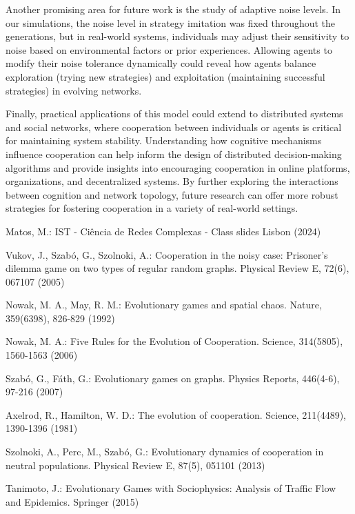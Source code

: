 \documentclass[runningheads]{llncs}
\begin{document}
Another promising area for future work is the study of adaptive noise levels. In our simulations, the noise level in strategy imitation was fixed throughout the generations, but in real-world systems, individuals may adjust their sensitivity to noise based on environmental factors or prior experiences. Allowing agents to modify their noise tolerance dynamically could reveal how agents balance exploration (trying new strategies) and exploitation (maintaining successful strategies) in evolving networks.

Finally, practical applications of this model could extend to distributed systems and social networks, where cooperation between individuals or agents is critical for maintaining system stability. Understanding how cognitive mechanisms influence cooperation can help inform the design of distributed decision-making algorithms and provide insights into encouraging cooperation in online platforms, organizations, and decentralized systems. By further exploring the interactions between cognition and network topology, future research can offer more robust strategies for fostering cooperation in a variety of real-world settings.

%
%
% 
% 
%
\begin{thebibliography}{8}
Matos, M.: IST - Ciência de Redes Complexas - Class slides
Lisbon (2024)


Vukov, J., Szabó, G., Szolnoki, A.: Cooperation in the noisy case: Prisoner's dilemma game on two types of regular random graphs. Physical Review E, 72(6), 067107 (2005)

Nowak, M. A., May, R. M.: Evolutionary games and spatial chaos. Nature, 359(6398), 826-829 (1992)

Nowak, M. A.: Five Rules for the Evolution of Cooperation. Science, 314(5805), 1560-1563 (2006)

Szabó, G., Fáth, G.: Evolutionary games on graphs. Physics Reports, 446(4-6), 97-216 (2007)

Axelrod, R., Hamilton, W. D.: The evolution of cooperation. Science, 211(4489), 1390-1396 (1981)

Szolnoki, A., Perc, M., Szabó, G.: Evolutionary dynamics of cooperation in neutral populations. Physical Review E, 87(5), 051101 (2013)

Tanimoto, J.: Evolutionary Games with Sociophysics: Analysis of Traffic Flow and Epidemics. Springer (2015)

\end{thebibliography}
\end{document}
